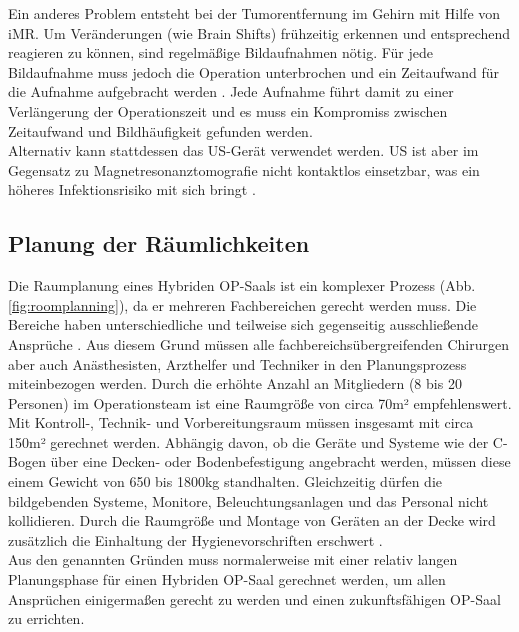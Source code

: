 Ein anderes Problem entsteht bei der Tumorentfernung im Gehirn mit Hilfe von iMR. Um Veränderungen (wie Brain Shifts) frühzeitig erkennen und entsprechend reagieren zu können, sind regelmäßige Bildaufnahmen nötig. Für jede Bildaufnahme muss jedoch die Operation unterbrochen und ein Zeitaufwand für die Aufnahme aufgebracht werden \cite{BrainShiftInTumorResection}. Jede Aufnahme führt damit zu einer Verlängerung der Operationszeit und es muss ein Kompromiss zwischen Zeitaufwand und Bildhäufigkeit gefunden werden.\\
Alternativ kann stattdessen das US-Gerät verwendet werden. US ist aber im Gegensatz zu Magnetresonanztomografie nicht kontaktlos einsetzbar, was ein höheres Infektionsrisiko mit sich bringt \cite{BrainShiftInTumorResection}.

\subsection{Planung der Räumlichkeiten}

Die Raumplanung eines Hybriden OP-Saals ist ein komplexer Prozess (Abb. \ref{fig:roomplanning}), da er mehreren Fachbereichen gerecht werden muss. Die Bereiche haben unterschiedliche und teilweise sich gegenseitig ausschließende Ansprüche \cite{TechnicalConsiderations}. Aus diesem Grund müssen alle fachbereichsübergreifenden Chirurgen aber auch Anästhesisten, Arzthelfer und Techniker in den Planungsprozess miteinbezogen werden.
Durch die erhöhte Anzahl an Mitgliedern (8 bis 20 Personen) im Operationsteam ist eine Raumgröße von circa 70m² empfehlenswert. Mit Kontroll-, Technik- und Vorbereitungsraum müssen insgesamt mit circa 150m² gerechnet werden. Abhängig davon, ob die Geräte und Systeme wie der C-Bogen über eine Decken- oder Bodenbefestigung angebracht werden, müssen diese einem Gewicht von 650 bis 1800kg standhalten. Gleichzeitig dürfen die bildgebenden Systeme, Monitore, Beleuchtungsanlagen und das Personal nicht kollidieren. Durch die Raumgröße und Montage von Geräten an der Decke wird zusätzlich die Einhaltung der Hygienevorschriften erschwert \cite{TechnicalConsiderations}.\\ 
Aus den genannten Gründen muss normalerweise mit einer relativ langen Planungsphase für einen Hybriden OP-Saal gerechnet werden, um allen Ansprüchen einigermaßen gerecht zu werden und einen zukunftsfähigen OP-Saal zu errichten.


